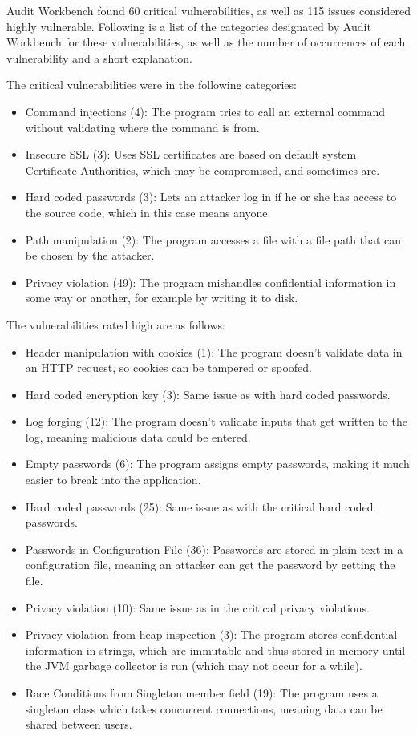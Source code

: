 \documentclass{article}
\begin{document}
  Audit Workbench found 60 critical vulnerabilities, as well as 115 issues
  considered highly vulnerable. Following is a list of the categories designated
  by Audit Workbench for these vulnerabilities, as well as the number of
  occurrences of each vulnerability and a short explanation.

  The critical vulnerabilities were in the
  following categories:
  
  \begin{itemize}
  \item Command injections (4): The program tries to call an external command
    without validating where the command is from.
  \item Insecure SSL (3): Uses SSL certificates are based on default system
    Certificate Authorities, which may be compromised, and sometimes are.
  \item Hard coded passwords (3): Lets an attacker log in if he or she has access
    to the source code, which in this case means anyone.
  \item Path manipulation (2): The program accesses a file with a file path that
    can be chosen by the attacker.
  \item Privacy violation (49): The program mishandles confidential information
    in some way or another, for example by writing it to disk.
  \end{itemize}

  The vulnerabilities rated high are as follows:

  \begin{itemize}
  \item Header manipulation with cookies (1): The program doesn't validate data
    in an HTTP request, so cookies can be tampered or spoofed.
  \item Hard coded encryption key (3): Same issue as with hard coded passwords.
  \item Log forging (12): The program doesn't validate inputs that get written
    to the log, meaning malicious data could be entered.
  \item Empty passwords (6): The program assigns empty passwords, making it much
    easier to break into the application.
  \item Hard coded passwords (25): Same issue as with the critical hard coded passwords.
  \item Passwords in Configuration File (36): Passwords are stored in plain-text
    in a configuration file, meaning an attacker can get the password by getting
    the file.
  \item Privacy violation (10): Same issue as in the critical privacy violations.
  \item Privacy violation from heap inspection (3): The program stores
    confidential information in strings, which are immutable and thus stored in
    memory until the JVM garbage collector is run (which may not occur for a
    while). 
  \item Race Conditions from Singleton member field (19): The program uses a
    singleton class which takes concurrent connections, meaning data can be
    shared between users.
  \end{itemize}
      
\end{document}
